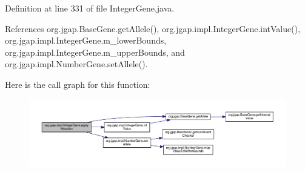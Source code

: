 Definition at line 331 of file Integer\-Gene.\-java.



References org.\-jgap.\-Base\-Gene.\-get\-Allele(), org.\-jgap.\-impl.\-Integer\-Gene.\-int\-Value(), org.\-jgap.\-impl.\-Integer\-Gene.\-m\-\_\-lower\-Bounds, org.\-jgap.\-impl.\-Integer\-Gene.\-m\-\_\-upper\-Bounds, and org.\-jgap.\-impl.\-Number\-Gene.\-set\-Allele().



Here is the call graph for this function\-:
\nopagebreak
\begin{figure}[H]
\begin{center}
\leavevmode
\includegraphics[width=350pt]{classorg_1_1jgap_1_1impl_1_1_integer_gene_af36f1f47459727cb4aefa0140ef03585_cgraph}
\end{center}
\end{figure}


